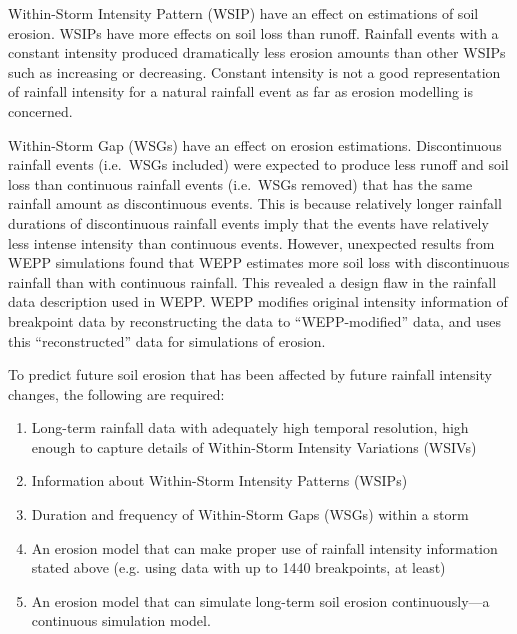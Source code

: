 Within-Storm Intensity Pattern (WSIP) have an effect on estimations of soil
erosion. WSIPs have more effects on soil loss than runoff. Rainfall events with
a constant intensity produced dramatically less erosion amounts than other WSIPs
such as increasing or decreasing. Constant intensity is not a good
representation of rainfall intensity for a natural rainfall event as far as
erosion modelling is concerned.

Within-Storm Gap (WSGs) have an effect on erosion estimations. Discontinuous
rainfall events (i.e.\ WSGs included) were expected to produce less runoff and
soil loss than continuous rainfall events (i.e.\ WSGs removed) that has the same
rainfall amount as discontinuous events. This is because relatively longer
rainfall durations of discontinuous rainfall events imply that the events have
relatively less intense intensity than continuous events. However, unexpected
results from WEPP simulations found that WEPP estimates more soil loss with
discontinuous rainfall than with continuous rainfall. This revealed a design
flaw in the rainfall data description used in WEPP. WEPP modifies original
intensity information of breakpoint data by reconstructing the data to
``WEPP-modified'' data, and uses this ``reconstructed'' data for simulations
of erosion.

To predict future soil erosion that has been affected by future rainfall
intensity changes, the following are required:
\begin{enumerate}
  \item Long-term rainfall data with adequately high temporal resolution, high
enough to capture details of Within-Storm Intensity Variations (WSIVs)
  \item Information about Within-Storm Intensity Patterns (WSIPs)
  \item Duration and frequency of Within-Storm Gaps (WSGs) within a storm
  \item An erosion model that can make proper use of rainfall intensity
information stated above (e.g. using data with up to 1440 breakpoints, at
least)
  \item An erosion model that can simulate long-term soil erosion
continuously---a continuous simulation model.
\end{enumerate}

